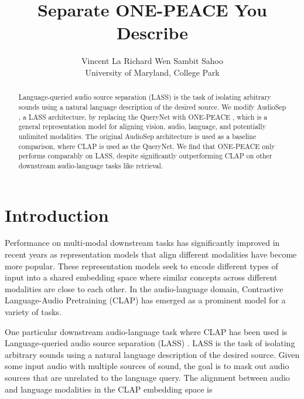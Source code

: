 \documentclass[11pt]{article}
\title{Separate ONE-PEACE You Describe}
\author{Vincent La \quad Richard Wen \quad Sambit Sahoo \\
        University of Maryland, College Park}
\begin{document}
\maketitle
\begin{abstract}

Language-queried audio source separation (LASS) is the task of isolating arbitrary sounds using a natural language description of the desired source. We modify AudioSep \cite{audiosep}, a LASS architecture, by replacing the QueryNet with ONE-PEACE \cite{onepeace}, which is a general representation model for aligning vision, audio, language, and potentially unlimited modalities. The original AudioSep architecture is used as a baseline comparison, where CLAP is used as the QueryNet. We find that ONE-PEACE only performs comparably on LASS, despite significantly outperforming CLAP on other downstream audio-language tasks like retrieval.


\end{abstract}

\section{Introduction}
Performance on multi-modal downstream tasks has significantly improved in recent years as representation models that align different modalities have become more popular. These representation models seek to encode different types of input into a shared embedding space where similar concepts across different modalities are close to each other. In the audio-language domain, Contrastive Language-Audio Pretraining (CLAP) \cite{clap} has emerged as a prominent model for a variety of tasks.

One particular downstream audio-language task where CLAP has been used is Language-queried audio source separation (LASS) \cite{lass}. LASS is the task of isolating arbitrary sounds using a natural language description of the desired source. Given some input audio with multiple sources of sound, the goal is to mask out audio sources that are unrelated to the language query. The alignment between audio and language modalities in the CLAP embedding space is 
\end{document}

